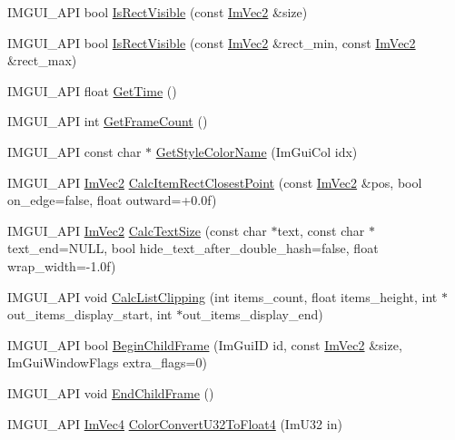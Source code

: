 \begin{DoxyCompactItemize}
\item 
I\+M\+G\+U\+I\+\_\+\+A\+PI bool \hyperlink{namespace_im_gui_a578ead6237b3ed05497ed361f18d9f97}{Is\+Rect\+Visible} (const \hyperlink{struct_im_vec2}{Im\+Vec2} \&size)
\item 
I\+M\+G\+U\+I\+\_\+\+A\+PI bool \hyperlink{namespace_im_gui_a5aca7e6939e07caaca489aa8c776fd81}{Is\+Rect\+Visible} (const \hyperlink{struct_im_vec2}{Im\+Vec2} \&rect\+\_\+min, const \hyperlink{struct_im_vec2}{Im\+Vec2} \&rect\+\_\+max)
\item 
I\+M\+G\+U\+I\+\_\+\+A\+PI float \hyperlink{namespace_im_gui_ab8d8a7a9e1a0e84e636202ec74733db9}{Get\+Time} ()
\item 
I\+M\+G\+U\+I\+\_\+\+A\+PI int \hyperlink{namespace_im_gui_a0180211f23fc10807dfc3d2f6e8681f9}{Get\+Frame\+Count} ()
\item 
I\+M\+G\+U\+I\+\_\+\+A\+PI const char $\ast$ \hyperlink{namespace_im_gui_a265d7614c4c0b92ba6dd43946a3293e0}{Get\+Style\+Color\+Name} (Im\+Gui\+Col idx)
\item 
I\+M\+G\+U\+I\+\_\+\+A\+PI \hyperlink{struct_im_vec2}{Im\+Vec2} \hyperlink{namespace_im_gui_a6c66a7acf7e6eef639b5f1211d8332a3}{Calc\+Item\+Rect\+Closest\+Point} (const \hyperlink{struct_im_vec2}{Im\+Vec2} \&pos, bool on\+\_\+edge=false, float outward=+0.\+0f)
\item 
I\+M\+G\+U\+I\+\_\+\+A\+PI \hyperlink{struct_im_vec2}{Im\+Vec2} \hyperlink{namespace_im_gui_a848b9db6cc4a186751c0ecebcaadc33b}{Calc\+Text\+Size} (const char $\ast$text, const char $\ast$text\+\_\+end=N\+U\+LL, bool hide\+\_\+text\+\_\+after\+\_\+double\+\_\+hash=false, float wrap\+\_\+width=-\/1.\+0f)
\item 
I\+M\+G\+U\+I\+\_\+\+A\+PI void \hyperlink{namespace_im_gui_ae5319370628374ef8febf0c25c285b7e}{Calc\+List\+Clipping} (int items\+\_\+count, float items\+\_\+height, int $\ast$out\+\_\+items\+\_\+display\+\_\+start, int $\ast$out\+\_\+items\+\_\+display\+\_\+end)
\item 
I\+M\+G\+U\+I\+\_\+\+A\+PI bool \hyperlink{namespace_im_gui_a26d6981a769d3fbe9be9a25975b5dc6b}{Begin\+Child\+Frame} (Im\+Gui\+ID id, const \hyperlink{struct_im_vec2}{Im\+Vec2} \&size, Im\+Gui\+Window\+Flags extra\+\_\+flags=0)
\item 
I\+M\+G\+U\+I\+\_\+\+A\+PI void \hyperlink{namespace_im_gui_ac4bd9024554b5074805bc0ce3076c514}{End\+Child\+Frame} ()
\item 
I\+M\+G\+U\+I\+\_\+\+A\+PI \hyperlink{struct_im_vec4}{Im\+Vec4} \hyperlink{namespace_im_gui_a74df648cad381b5ad979c3609b7f4b2a}{Color\+Convert\+U32\+To\+Float4} (Im\+U32 in)

\end{DoxyCompactItemize}
